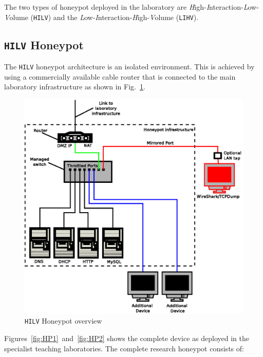 \documentclass{llncs}
\begin{document}
The two types of honeypot deployed in the laboratory are
\emph{H}igh-\emph{I}nteraction-\emph{L}ow-\emph{V}olume (\texttt{HILV}) and the
\emph{L}ow-\emph{I}nteraction-\emph{H}igh-\emph{V}olume (\texttt{LIHV}).

\subsection{\texttt{HILV} Honeypot}

The \texttt{HILV} honeypot architecture is an isolated environment. This is
achieved by using a commercially available cable router that is connected to
the main laboratory infrastructure as shown in Fig.~\ref{fig:HPOverview}.

\begin{figure}[!ht]
\begin{center}
	\includegraphics[scale=0.70]{Images/Honeypot1.eps}
\caption{\texttt{HILV} Honeypot overview}
\label{fig:HPOverview}
\end{center}
\end{figure}

Figures~\ref{fig:HP1}~and~\ref{fig:HP2} shows the complete device as deployed
in the specialist teaching laboratories. The complete research honeypot
consists of:
\end{document}
